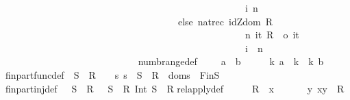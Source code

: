\begin{isabellebody}
\ \ \ \ \ \ \ \ \ \ \ \ \ \ \ \ \ \ \ \ \ \ \ \ \ \ \ \ \ \ \ \ \ \ \ \ \ \ \ \ \ \ \ \ \ \ \ \ \ \ {\isacharparenleft}{\isachardollar}i\ n{\isacharparenright}{\isacharparenright}\isanewline
\ \ \ \ \ \ \ \ \ \ \ \ \ \ \ \ \ \ \ \ \ \ \ \ \ \ \ \ \ \ \ \ \ \ \ \ else\ {\isacharparenleft}nat{\isacharunderscore}rec\ {\isacharparenleft}idZ{\isacharparenleft}dom\ {\isacharparenleft}R\ {\isacharpercent}{\isachartilde}{\isacharparenright}{\isacharparenright}{\isacharparenright}\ \isanewline
\ \ \ \ \ \ \ \ \ \ \ \ \ \ \ \ \ \ \ \ \ \ \ \ \ \ \ \ \ \ \ \ \ \ \ \ \ \ \ \ \ \ \ \ \ \ \ \ \ \ {\isacharparenleft}{\isacharpercent}n\ it{\isachardot}\ {\isacharparenleft}R\ {\isacharpercent}{\isachartilde}{\isacharparenright}\ {\isacharpercent}o\ it{\isacharparenright}{\isacharparenright}\ \ \ \isanewline
\ \ \ \ \ \ \ \ \ \ \ \ \ \ \ \ \ \ \ \ \ \ \ \ \ \ \ \ \ \ \ \ \ \ \ \ \ \ \ \ \ \ \ \ \ \ \ \ \ \ {\isacharparenleft}{\isachardollar}i\ {\isacharparenleft}\ n{\isacharparenright}{\isacharparenright}{\isachardoublequoteclose}\ \ \ \ \isanewline
\ \ \ \ \ \ \ \ \ \ \ \ \ \ \ \ \ \ \ \ \ \ \ \ \ \ \ \isanewline
numb{\isacharunderscore}range{\isacharunderscore}def{\isacharcolon}\ \ \ \ \ {\isachardoublequoteopen}{\isacharparenleft}a\ {\isachardot}{\isachardot}\ b{\isacharparenright}\ \ \ \ {\isacharequal}{\isacharequal}\ {\isacharbraceleft}\ k{\isachardot}\ a\ {\isacharless}{\isacharequal}\ k\ {\isacharampersand}\ k{\isacharless}{\isacharequal}\ b{\isacharbraceright}{\isachardoublequoteclose}\isanewline
fin{\isacharunderscore}part{\isacharunderscore}func{\isacharunderscore}def{\isacharcolon}\ \ {\isachardoublequoteopen}S\ {\isacharminus}{\isacharbar}{\isacharbar}{\isacharminus}{\isachargreater}\ R\ \ \ {\isacharequal}{\isacharequal}\ {\isacharbraceleft}s{\isachardot}\ s\ {\isacharcolon}\ S\ {\isacharminus}{\isacharbar}{\isacharminus}{\isachargreater}\ R\ {\isacharampersand}\ dom{\isacharparenleft}s{\isacharparenright}\ {\isacharcolon}\ Fin{\isacharparenleft}S{\isacharparenright}{\isacharbraceright}{\isachardoublequoteclose}\isanewline
fin{\isacharunderscore}part{\isacharunderscore}inj{\isacharunderscore}def{\isacharcolon}\ \ \ {\isachardoublequoteopen}S\ {\isachargreater}{\isacharminus}{\isacharbar}{\isacharbar}{\isacharminus}{\isachargreater}\ R\ \ {\isacharequal}{\isacharequal}\ {\isacharparenleft}S\ {\isachargreater}{\isacharminus}{\isacharbar}{\isacharminus}{\isachargreater}\ R{\isacharparenright}\ Int\ {\isacharparenleft}S\ {\isacharminus}{\isacharbar}{\isacharbar}{\isacharminus}{\isachargreater}\ R{\isacharparenright}{\isachardoublequoteclose}\isanewline
rel{\isacharunderscore}apply{\isacharunderscore}def{\isacharcolon}\ \ \ \ \ \ {\isachardoublequoteopen}R\ {\isacharpercent}{\isacharcircum}\ x\ \ \ \ \ \ {\isacharequal}{\isacharequal}\ {\isacharparenleft}{\isacharat}y{\isachardot}\ {\isacharparenleft}x{\isacharcomma}y{\isacharparenright}\ {\isacharcolon}\ R{\isacharparenright}{\isachardoublequoteclose}\isanewline

\end{isabellebody}
